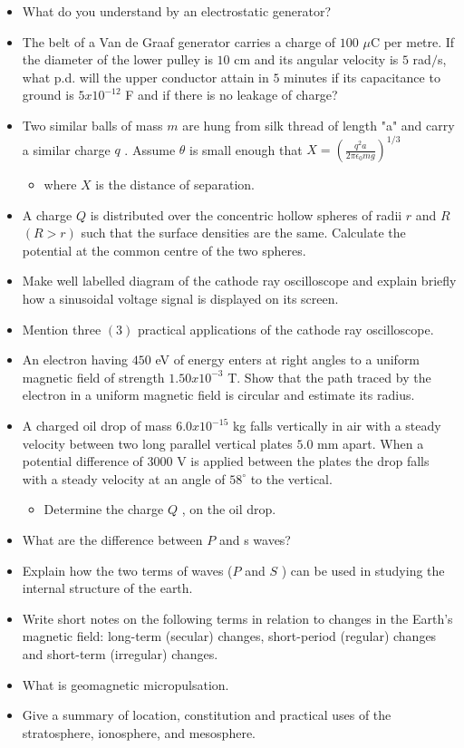 \documentclass{article}
\begin{document}
\begin{itemize}
\begin{itemize}
\end{itemize}
\item What do you understand by an electrostatic generator?
\item The belt of a Van de Graaf generator carries a charge of $ 100$ $\mu$C per metre.  If the diameter of the lower pulley is $ 10$ cm and its angular velocity is $ 5$ rad$/$s, what p.d. will the upper conductor attain in $ 5$ minutes if its capacitance to ground is $ 5x10^{-12}$ F and if there is no leakage of charge?
\item Two similar balls of mass $ m$ are hung from silk thread of length "a" and carry a similar charge $ q$ .  Assume $ \theta $ is small enough that $ X = (\frac{q^2 a}{2 \pi \epsilon_0 m g})^{1/3}$
 \begin{itemize}
\item where $ X$ is the distance of separation.
\end{itemize}
\item A charge $ Q$ is distributed over the concentric hollow spheres of radii $ r$ and $ R$ $ (R>r)$ such that the surface densities are the same.  Calculate the potential at the common centre of the two spheres.
\item Make well labelled diagram of the cathode ray oscilloscope and explain briefly how a sinusoidal voltage signal is displayed on its screen.
\item Mention three $ (3)$ practical applications of the cathode ray oscilloscope.
\item An electron having $ 450$ eV of energy enters at right angles to a uniform magnetic field of strength $ 1.50x10^{-3}$ T.  Show that the path traced by the electron in a uniform magnetic field is circular and estimate its radius.
\item A charged oil drop of mass $ 6.0x10^{-15}$ kg falls vertically in air with a steady velocity between two long parallel vertical plates $ 5.0$ mm apart.  When a potential difference of $ 3000$ V is applied between the plates the drop falls with a steady velocity at an angle of $ 58^{\circ}$ to the vertical.
 \begin{itemize}
\item Determine the charge $ Q$ , on the oil drop.
\end{itemize}
\item What are the difference between $ P$ and s waves?
\item Explain how the two terms of waves ($ P$ and $ S$ ) can be used in studying the internal structure of the earth. 
\item Write short notes on the following terms in relation to changes in the Earth's magnetic field:  long-term (secular) changes, short-period (regular) changes and short-term (irregular) changes.
\item What is geomagnetic micropulsation.
\item Give a summary of location, constitution and practical uses of the stratosphere, ionosphere, and mesosphere.
\end{itemize}
\end{document}
